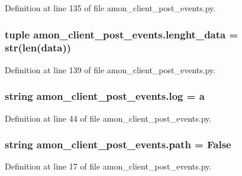 Definition at line 135 of file amon\-\_\-client\-\_\-post\-\_\-events.\-py.

\hypertarget{namespaceamon__client__post__events_a01c39c83ce37b30cf0fc7c3f3aa779b1}{
\subsubsection[{lenght\-\_\-data}]{\setlength{\rightskip}{0pt plus 5cm}tuple amon\-\_\-client\-\_\-post\-\_\-events.\-lenght\-\_\-data = str(len({\bf data}))}}\label{namespaceamon__client__post__events_a01c39c83ce37b30cf0fc7c3f3aa779b1}


Definition at line 139 of file amon\-\_\-client\-\_\-post\-\_\-events.\-py.

\hypertarget{namespaceamon__client__post__events_a03c635092fabd2377d49fc08d83c54ed}{
\subsubsection[{log}]{\setlength{\rightskip}{0pt plus 5cm}string amon\-\_\-client\-\_\-post\-\_\-events.\-log = a}}\label{namespaceamon__client__post__events_a03c635092fabd2377d49fc08d83c54ed}


Definition at line 44 of file amon\-\_\-client\-\_\-post\-\_\-events.\-py.

\hypertarget{namespaceamon__client__post__events_a027c76dd7a438a9a0ec7bb76a44f9bd2}{
\subsubsection[{path}]{\setlength{\rightskip}{0pt plus 5cm}string amon\-\_\-client\-\_\-post\-\_\-events.\-path = False}}\label{namespaceamon__client__post__events_a027c76dd7a438a9a0ec7bb76a44f9bd2}


Definition at line 17 of file amon\-\_\-client\-\_\-post\-\_\-events.\-py.

